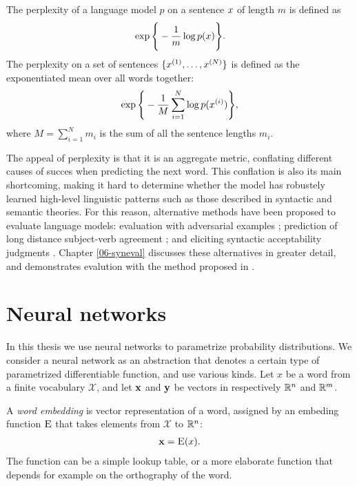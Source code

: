     \begin{definition}{} The perplexity of a language model $p$ on a sentence $x$ of length $m$ is defined as
    \begin{align*}
      \exp \Bigg\{ - \frac{1}{m} \log p( x ) \Bigg\}.
    \end{align*}
    The perplexity on a set of sentences $\{ x^{(1)}, \dots, x^{(N)} \}$ is defined as the exponentiated mean over all words together:
    \begin{align*}
      \exp \Bigg\{ - \frac{1}{M} \sum_{i=1}^N \log p( x^{(i)} ) \Bigg\},
    \end{align*}
    where $M = \sum_{i=1}^N m_i$ is the sum of all the sentence lengths $m_i$.
    \end{definition}

   The appeal of perplexity is that it is an aggregate metric, conflating different causes of succes when predicting the next word. This conflation is also its main shortcoming, making it hard to determine whether the model has robustely learned high-level linguistic patterns such as those described in syntactic and semantic theories. For this reason, alternative methods have been proposed to evaluate language models: evaluation with adversarial examples \citep{smith2012adversarial}; prediction of long distance subject-verb agreement \citep{linzen2016syntax}; and eliciting syntactic acceptability judgments \citep{linzen2018targeted}. Chapter \ref{06-syneval} discusses these alternatives in greater detail, and demonstrates evalution with the method proposed in \citep{linzen2018targeted}.


\section{Neural networks}

  In this thesis we use neural networks to parametrize probability distributions. We consider a neural network as an abstraction that denotes a certain type of parametrized differentiable function, and use various kinds. Let $x$ be a word from a finite vocabulary $\mathcal{X}$, and let $\mathbf{x}$ and $\mathbf{y}$ be vectors in respectively $\mathbb{R}^{n}$ and $\mathbb{R}^{m}$.

  \begin{definition}{} A \textit{word embedding} is vector representation of a word, assigned by an embeding function $\textsc{E}$ that takes elements from $\mathcal{X}$ to $\mathbb{R}^{n}$:
  \begin{align*}
    \mathbf{x} = \textsc{E}( x ).
  \end{align*}
  The function can be a simple lookup table, or a more elaborate function that depends for example on the orthography of the word.
  \end{definition}

